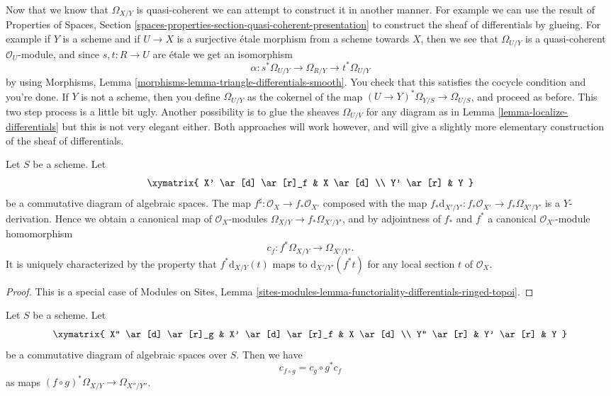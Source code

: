 \begin{remark}
\label{remark-alternative}
Now that we know that $\Omega_{X/Y}$ is quasi-coherent we can attempt
to construct it in another manner. For example we can use the result of
Properties of Spaces,
Section \ref{spaces-properties-section-quasi-coherent-presentation}
to construct the sheaf of differentials by glueing.
For example if $Y$ is a scheme and if $U \to X$ is a surjective \'etale morphism
from a scheme towards $X$, then we see that $\Omega_{U/Y}$ is
a quasi-coherent $\mathcal{O}_U$-module, and since $s, t : R \to U$
are \'etale we get an isomorphism
$$
\alpha : s^*\Omega_{U/Y} \to \Omega_{R/Y} \to t^*\Omega_{U/Y}
$$
by using
Morphisms, Lemma \ref{morphisms-lemma-triangle-differentials-smooth}.
You check that this satisfies the cocycle condition and you're done.
If $Y$ is not a scheme, then you define $\Omega_{U/Y}$ as the cokernel
of the map $(U \to Y)^*\Omega_{Y/S} \to \Omega_{U/S}$, and proceed as
before. This two step process is a little bit ugly. Another possibility
is to glue the sheaves $\Omega_{U/V}$ for any diagram as in
Lemma \ref{lemma-localize-differentials}
but this is not very elegant either. Both approaches will work however, and
will give a slightly more elementary construction of the sheaf of
differentials.
\end{remark}

\begin{lemma}
\label{lemma-functoriality-differentials}
Let $S$ be a scheme. Let
$$
\xymatrix{
X' \ar[d] \ar[r]_f & X \ar[d] \\
Y' \ar[r] & Y
}
$$
be a commutative diagram of algebraic spaces. The map
$f^\sharp : \mathcal{O}_X \to f_*\mathcal{O}_{X'}$ composed with the map
$f_*\text{d}_{X'/Y'} : f_*\mathcal{O}_{X'} \to f_*\Omega_{X'/Y'}$ is a
$Y$-derivation. Hence we obtain a canonical map of $\mathcal{O}_X$-modules
$\Omega_{X/Y} \to f_*\Omega_{X'/Y'}$, and by
adjointness of $f_*$ and $f^*$ a
canonical $\mathcal{O}_{X'}$-module homomorphism
$$
c_f : f^*\Omega_{X/Y} \longrightarrow \Omega_{X'/Y'}.
$$
It is uniquely characterized by the property that
$f^*\text{d}_{X/Y}(t)$ maps to $\text{d}_{X'/Y'}(f^* t)$
for any local section $t$ of $\mathcal{O}_X$.
\end{lemma}

\begin{proof}
This is a special case of
Modules on Sites, Lemma
\ref{sites-modules-lemma-functoriality-differentials-ringed-topoi}.
\end{proof}

\begin{lemma}
\label{lemma-check-functoriality-differentials}
Let $S$ be a scheme. Let
$$
\xymatrix{
X'' \ar[d] \ar[r]_g & X' \ar[d] \ar[r]_f & X \ar[d] \\
Y'' \ar[r] & Y' \ar[r] & Y
}
$$
be a commutative diagram of algebraic spaces over $S$. Then we have
$$
c_{f \circ g} = c_g \circ g^* c_f
$$
as maps $(f \circ g)^*\Omega_{X/Y} \to \Omega_{X''/Y''}$.
\end{lemma}

